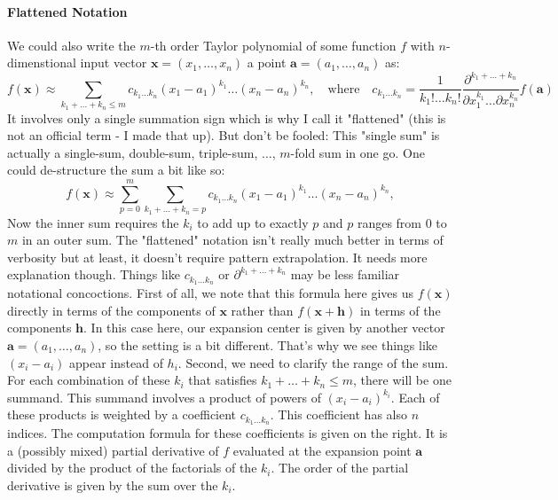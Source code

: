 \paragraph{Flattened Notation}
We could also write the $m$-th order Taylor polynomial of some function $f$ with $n$-dimenstional input vector $\mathbf{x} = (x_1, \ldots, x_n)$ a point $\mathbf{a} = (a_1, \ldots, a_n)$ as:
\begin{equation}
\label{Eq:TaylorSeriesMultiDimFlat}
 f(\mathbf{x}) \approx
 \sum_{k_1+\ldots+k_n \leq m} c_{k_1 \ldots k_n} (x_1 - a_1)^{k_1} \ldots (x_n - a_n)^{k_n}, 
 \quad \text{where} \quad
 c_{k_1 \ldots k_n} = \frac{1}{k_1 ! \ldots k_n!} 
                      \frac{ \partial^{k_1+\ldots+k_n} }
                           { \partial x_1 ^{k_1} \ldots \partial x_n ^ {k_n}} f(\mathbf{a})
\end{equation}
It involves only a single summation sign which is why I call it "flattened" (this is not an official term - I made that up). But don't be fooled: This "single sum" is actually a single-sum, double-sum, triple-sum, $\ldots$, $m$-fold sum in one go. One could de-structure the sum a bit like so:
\begin{equation}
 f(\mathbf{x}) \approx
 \sum_{p=0}^{m}
 \sum_{k_1+\ldots+k_n = p} c_{k_1 \ldots k_n} (x_1 - a_1)^{k_1} \ldots (x_n - a_n)^{k_n}, 
\end{equation}
Now the inner sum requires the $k_i$ to add up to exactly $p$ and $p$ ranges from $0$ to $m$ in an outer sum. The "flattened" notation isn't really much better in terms of verbosity but at least, it doesn't require pattern extrapolation. It needs more explanation though. Things like $c_{k_1 \ldots k_n}$ or $\partial^{k_1+\ldots+k_n}$ may be less familiar notational concoctions. First of all, we note that this formula here gives us $f(\mathbf{x})$ directly in terms of the components of $\mathbf{x}$ rather than $f(\mathbf{x + h})$ in terms of the components $\mathbf{h}$. In this case here, our expansion center is given by another vector $\mathbf{a} = (a_1, \ldots, a_n)$, so the setting is a bit different. That's why we see things like $(x_i - a_i)$ appear instead of $h_i$. Second, we need to clarify the range of the sum. For each combination of these $k_i$ that satisfies $k_1+\ldots+k_n \leq m$, there will be one summand. This summand involves a product of powers of $(x_i - a_i)^{k_i}$. Each of these products is weighted by a coefficient $c_{k_1 \ldots k_n}$. This coefficient has also $n$ indices. The computation formula for these coefficients is given on the right. It is a (possibly mixed) partial derivative of $f$ evaluated at the expansion point $\mathbf{a}$ divided by the product of the factorials of the $k_i$. The order of the partial derivative is given by the sum over the $k_i$. 











